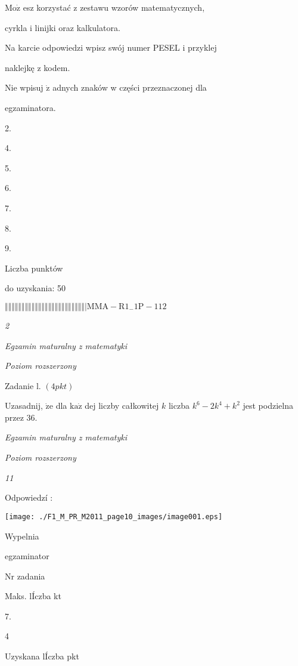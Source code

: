 \documentclass[a4paper,12pt]{article}
\begin{document}
$\mathrm{M}\mathrm{o}\dot{\mathrm{z}}$ esz korzystać z zestawu wzorów matematycznych,

cyrkla i linijki oraz kalkulatora.

Na karcie odpowiedzi wpisz swój numer PESEL i przyklej

naklejkę z kodem.

Nie wpisuj $\dot{\mathrm{z}}$ adnych znaków w części przeznaczonej dla

egzaminatora.

2.

4.

5.

6.

7.

8.

9.

Liczba punktów

do uzyskania: 50

$\Vert\Vert\Vert\Vert\Vert\Vert\Vert\Vert\Vert\Vert\Vert\Vert\Vert\Vert\Vert\Vert\Vert\Vert\Vert\Vert\Vert\Vert\Vert\Vert|  \mathrm{M}\mathrm{M}\mathrm{A}-\mathrm{R}1_{-}1\mathrm{P}-112$




{\it 2}

{\it Egzamin maturalny z matematyki}

{\it Poziom rozszerzony}

Zadanie l. $(4pkt)$

Uzasadnij, $\dot{\mathrm{z}}\mathrm{e}$ dla $\mathrm{k}\mathrm{a}\dot{\mathrm{z}}$ dej liczby całkowitej $k$ liczba $k^{6}-2k^{4}+k^{2}$ jest podzielna przez 36.





{\it Egzamin maturalny z matematyki}

{\it Poziom rozszerzony}

{\it 11}

Odpowiedzí :
\begin{center}
\texttt{[image: ./F1\_M\_PR\_M2011\_page10\_images/image001.eps]}
\end{center}
Wypelnia

egzaminator

Nr zadania

Maks. lÍczba kt

7.

4

Uzyskana lÍczba pkt
\end{document}
